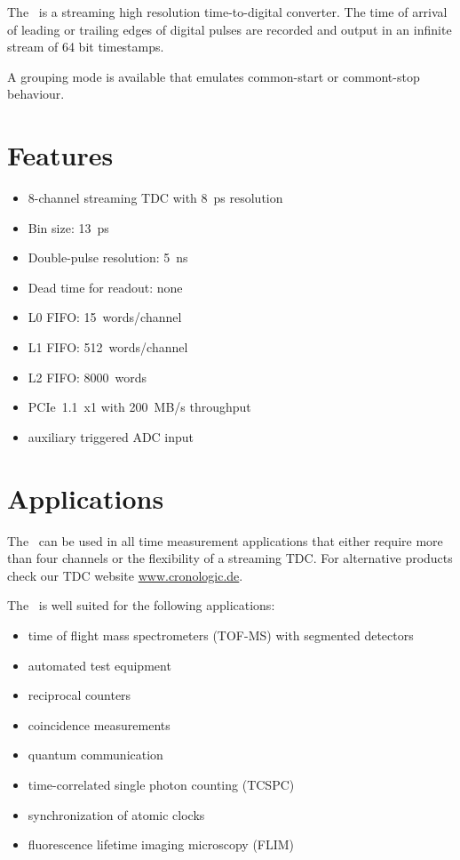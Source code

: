 The \deviceName\ is a streaming high resolution time-to-digital converter. 
The time of arrival of leading or trailing edges of digital pulses are recorded and output in an infinite stream of 64 bit timestamps.

A grouping mode is available that emulates common-start or commont-stop behaviour. 

\section{Features}
	\begin{itemize}
		\item 8-channel streaming TDC with 8~ps resolution
		\item Bin size: 13~ps
		\item Double-pulse resolution: 5~ns
		\item Dead time for readout: none
		\item L0 FIFO: 15~words/channel
		\item L1 FIFO: 512~words/channel
		\item L2 FIFO: 8000~words
		\item PCIe~1.1~x1 with 200~MB/s throughput
		\item auxiliary triggered ADC input
	\end{itemize} 
\section{Applications}
The \deviceName\ can be used in all time measurement applications that either require more than four channels or the flexibility of a streaming TDC. 
For alternative products check our TDC website \href{https://www.cronologic.de/produkte/products-overview#tdcdata}{www.cronologic.de}.

The \deviceName\ is well suited for the following applications:
\begin{itemize}
	\item time of flight mass spectrometers (TOF-MS) with segmented detectors
	\item automated test equipment
	\item reciprocal counters
	\item coincidence measurements
	\item quantum communication
	\item time-correlated single photon counting (TCSPC)
	\item synchronization of atomic clocks
	\item fluorescence lifetime imaging microscopy (FLIM)
\end{itemize} 